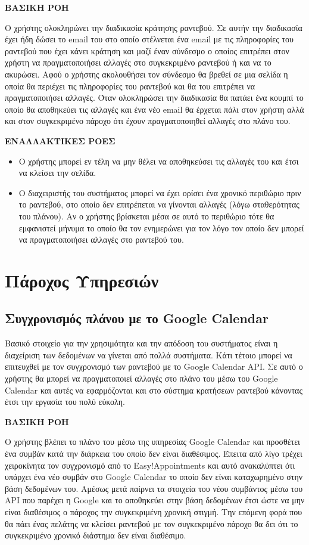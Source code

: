 \textbf{ΒΑΣΙΚΗ ΡΟΗ}

Ο χρήστης ολοκληρώνει την διαδικασία κράτησης ραντεβού. Σε αυτήν την διαδικασία έχει ήδη δώσει το email του στο οποίο στέλνεται ένα email με τις πληροφορίες του ραντεβού που έχει κάνει κράτηση και μαζί έναν σύνδεσμο ο οποίος επιτρέπει στον χρήστη να πραγματοποιήσει αλλαγές στο συγκεκριμένο ραντεβού ή και να το ακυρώσει. Αφού ο χρήστης ακολουθήσει τον σύνδεσμο θα βρεθεί σε μια σελίδα η οποία θα περιέχει τις πληροφορίες του ραντεβού και θα του επιτρέπει να πραγματοποιήσει αλλαγές. Όταν ολοκληρώσει την διαδικασία θα πατάει ένα κουμπί το οποίο θα αποθηκεύει τις αλλαγές και ένα νέο email θα έρχεται πάλι στον χρήστη αλλά και στον συγκεκριμένο πάροχο ότι έχουν πραγματοποιηθεί αλλαγές στο πλάνο του.

\textbf{ΕΝΑΛΛΑΚΤΙΚΕΣ ΡΟΕΣ}

\begin{itemize}
\item Ο χρήστης μπορεί εν τέλη να μην θέλει να αποθηκεύσει τις αλλαγές του και έτσι να κλείσει την σελίδα.
\item Ο διαχειριστής του συστήματος μπορεί να έχει ορίσει ένα χρονικό περιθώριο πριν το ραντεβού, στο οποίο δεν επιτρέπεται να γίνονται αλλαγές (λόγω σταθερότητας του πλάνου). Αν ο χρήστης βρίσκεται μέσα σε αυτό το περιθώριο τότε θα εμφανιστεί μήνυμα το οποίο θα τον ενημερώνει για τον λόγο τον οποίο δεν μπορεί να πραγματοποιήσει αλλαγές στο ραντεβού του. 
\end{itemize}

\section {Πάροχος Υπηρεσιών}
\subsection {Συγχρονισμός πλάνου με το Google Calendar}
Βασικό στοιχείο για την χρησιμότητα και την απόδοση του συστήματος είναι η διαχείριση των δεδομένων να γίνεται από πολλά συστήματα. Κάτι τέτοιο μπορεί να επιτευχθεί με τον συγχρονισμό των ραντεβού με το Google Calendar API. Σε αυτό ο χρήστης θα μπορεί να πραγματοποιεί αλλαγές στο πλάνο του μέσω του Google Calendar και αυτές να εφαρμόζονται και στο σύστημα κρατήσεων ραντεβού κάνοντας έτσι την εργασία του πολύ εύκολη.

\textbf{ΒΑΣΙΚΗ ΡΟΗ}

Ο χρήστης βλέπει το πλάνο του μέσω της υπηρεσίας Google Calendar και προσθέτει ένα συμβάν κατά την διάρκεια του οποίο δεν είναι διαθέσιμος. Έπειτα από λίγο τρέχει χειροκίνητα τον συγχρονισμό από το Easy!Appointments και αυτό ανακαλύπτει ότι υπάρχει ένα νέο συμβάν στο Google Calendar το οποίο δεν είναι καταχωρημένο στην βάση δεδομένων του. Αμέσως μετά παίρνει τα στοιχεία του νέου συμβάντος μέσω του API που παρέχει η Google και το αποθηκεύει στην βάση δεδομένων έτσι ώστε να μην είναι διαθέσιμος ο πάροχος την συγκεκριμένη χρονική στιγμή. Την επόμενη φορά που θα πάει ένας πελάτης να κλείσει ραντεβού με τον συγκεκριμένο πάροχο θα δει ότι το συγκεκριμένο χρονικό διάστημα δεν είναι διαθέσιμο.

